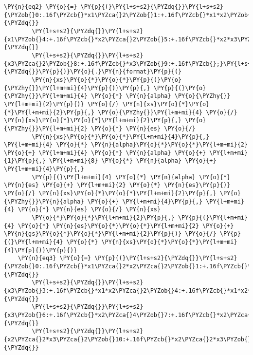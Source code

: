 \begin{Verbatim}[commandchars=\\\{\}]
    \PY{n}{eq2} \PY{o}{=} \PY{p}{(}\PY{l+s+s2}{\PYZdq{}}\PY{l+s+s2}{\PYZob{}0:.16f\PYZcb{}*x1\PYZca{}2\PYZob{}1:+.16f\PYZcb{}*x1*x2\PYZob{}2:+.16f\PYZcb{}*x1*x3\PYZob{}3:+.16f\PYZcb{}*}\PY{l+s+s2}{\PYZdq{}}
        \PY{l+s+s2}{\PYZdq{}}\PY{l+s+s2}{x1\PYZob{}4:+.16f\PYZcb{}*x2\PYZca{}2\PYZob{}5:+.16f\PYZcb{}*x2*x3\PYZob{}6:+.16f\PYZcb{}*x2\PYZob{}7:+.16f\PYZcb{}*}\PY{l+s+s2}{\PYZdq{}}
        \PY{l+s+s2}{\PYZdq{}}\PY{l+s+s2}{x3\PYZca{}2\PYZob{}8:+.16f\PYZcb{}*x3\PYZob{}9:+.16f\PYZcb{};}\PY{l+s+s2}{\PYZdq{}}\PY{p}{)}\PY{o}{.}\PY{n}{format}\PY{p}{(}
        \PY{n}{xs}\PY{o}{*}\PY{o}{*}\PY{p}{(}\PY{o}{\PYZhy{}}\PY{l+m+mi}{4}\PY{p}{)}\PY{p}{,} \PY{p}{(}\PY{o}{\PYZhy{}}\PY{l+m+mi}{4} \PY{o}{*} \PY{n}{alpha} \PY{o}{\PYZhy{}} \PY{l+m+mi}{2}\PY{p}{)} \PY{o}{/} \PY{n}{xs}\PY{o}{*}\PY{o}{*}\PY{l+m+mi}{2}\PY{p}{,} \PY{o}{\PYZhy{}}\PY{l+m+mi}{4} \PY{o}{/} \PY{n}{xs}\PY{o}{*}\PY{o}{*}\PY{l+m+mi}{2}\PY{p}{,} \PY{o}{\PYZhy{}}\PY{l+m+mi}{2} \PY{o}{*} \PY{n}{es} \PY{o}{/}
        \PY{n}{xs}\PY{o}{*}\PY{o}{*}\PY{l+m+mi}{4}\PY{p}{,} \PY{l+m+mi}{4} \PY{o}{*} \PY{n}{alpha}\PY{o}{*}\PY{o}{*}\PY{l+m+mi}{2} \PY{o}{+} \PY{l+m+mi}{4} \PY{o}{*} \PY{n}{alpha} \PY{o}{+} \PY{l+m+mi}{1}\PY{p}{,} \PY{l+m+mi}{8} \PY{o}{*} \PY{n}{alpha} \PY{o}{+} \PY{l+m+mi}{4}\PY{p}{,}
        \PY{p}{(}\PY{l+m+mi}{4} \PY{o}{*} \PY{n}{alpha} \PY{o}{*} \PY{n}{es} \PY{o}{+} \PY{l+m+mi}{2} \PY{o}{*} \PY{n}{es}\PY{p}{)} \PY{o}{/} \PY{n}{xs}\PY{o}{*}\PY{o}{*}\PY{l+m+mi}{2}\PY{p}{,} \PY{o}{\PYZhy{}}\PY{n}{alpha} \PY{o}{+} \PY{l+m+mi}{4}\PY{p}{,} \PY{l+m+mi}{4} \PY{o}{*} \PY{n}{es} \PY{o}{/} \PY{n}{xs}
        \PY{o}{*}\PY{o}{*}\PY{l+m+mi}{2}\PY{p}{,} \PY{p}{(}\PY{l+m+mi}{4} \PY{o}{*} \PY{n}{es}\PY{o}{*}\PY{o}{*}\PY{l+m+mi}{2} \PY{o}{+} \PY{n}{gs}\PY{o}{*}\PY{o}{*}\PY{l+m+mi}{2}\PY{p}{)} \PY{o}{/} \PY{p}{(}\PY{l+m+mi}{4} \PY{o}{*} \PY{n}{xs}\PY{o}{*}\PY{o}{*}\PY{l+m+mi}{4}\PY{p}{)}\PY{p}{)}
    \PY{n}{eq3} \PY{o}{=} \PY{p}{(}\PY{l+s+s2}{\PYZdq{}}\PY{l+s+s2}{\PYZob{}0:.16f\PYZcb{}*x1\PYZca{}2*x2\PYZca{}2\PYZob{}1:+.16f\PYZcb{}*x1*x2\PYZca{}3\PYZob{}2:+.16f\PYZcb{}*x1*x2\PYZca{}2*}\PY{l+s+s2}{\PYZdq{}}
        \PY{l+s+s2}{\PYZdq{}}\PY{l+s+s2}{x3\PYZob{}3:+.16f\PYZcb{}*x1*x2\PYZca{}2\PYZob{}4:+.16f\PYZcb{}*x1*x2*x3\PYZca{}2\PYZob{}5:+.16f\PYZcb{}*x1*x2*}\PY{l+s+s2}{\PYZdq{}}
        \PY{l+s+s2}{\PYZdq{}}\PY{l+s+s2}{x3\PYZob{}6:+.16f\PYZcb{}*x2\PYZca{}4\PYZob{}7:+.16f\PYZcb{}*x2\PYZca{}3*x3\PYZob{}8:+.16f\PYZcb{}*x2\PYZca{}3\PYZob{}9:+.16f\PYZcb{}*}\PY{l+s+s2}{\PYZdq{}}
        \PY{l+s+s2}{\PYZdq{}}\PY{l+s+s2}{x2\PYZca{}2*x3\PYZca{}2\PYZob{}10:+.16f\PYZcb{}*x2\PYZca{}2*x3\PYZob{}11:+.16f\PYZcb{}*x2\PYZca{}2\PYZob{}12:+.16f\PYZcb{}*x2*}\PY{l+s+s2}{\PYZdq{}}

\end{Verbatim}
